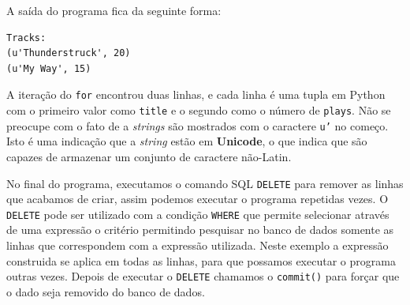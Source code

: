 
A saída do programa fica da seguinte forma:

\beforeverb
\begin{verbatim}
Tracks:
(u'Thunderstruck', 20)
(u'My Way', 15)
\end{verbatim}
\afterverb
%

A iteração do {\tt for} encontrou duas linhas, e cada linha é uma tupla em
Python com o primeiro valor como {\tt title} e o segundo como o número de
{\tt plays}. Não se preocupe com o fato de a {\it strings} são mostrados com
o caractere {\tt u'} no começo. Isto é uma indicação que a {\it string} estão
em {\bf Unicode}, o que indica que são capazes de armazenar um conjunto de
caractere não-Latin.


No final do programa, executamos o comando SQL {\tt DELETE} para remover as
linhas que acabamos de criar, assim podemos executar o programa repetidas
vezes. O {\tt DELETE} pode ser utilizado com a condição {\tt WHERE} que permite
selecionar através de uma expressão o critério permitindo pesquisar no banco
de dados somente as linhas que correspondem com a expressão utilizada. Neste
exemplo a expressão construida se aplica em todas as linhas, para que possamos
executar o programa outras vezes. Depois de executar o {\tt DELETE} chamamos o
{\tt commit()} para forçar que o dado seja removido do banco de dados.

